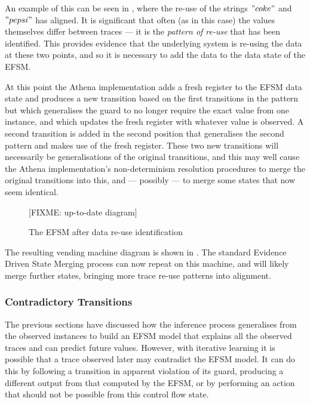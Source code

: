 An example of this can be seen in , where the re-use of the strings $"coke"$ and $"pepsi"$ has aligned. It is significant that often (as in this case) the values themselves differ between traces --- it is the \emph{pattern of re-use} that has been identified. This provides evidence that the underlying system is re-using the data at these two points, and so it is necessary to add the data to the data state of the EFSM. 

At this point the Athena implementation adds a fresh register to the EFSM data state and produces a new transition based on the first transitions in the pattern but which generalises the guard to no longer require the exact value from one instance, and which updates the fresh register with whatever value is observed. A second transition is added in the second position that generalises the second pattern and makes use of the fresh register. These two new transitions will necessarily be generalisations of the original transitions, and this may well cause the Athena implementation's non-determinism resolution procedures to merge the original transitions into this, and --- possibly --- to merge some states that now seem identical.

\begin{figure}[h]
\begin{center}
[FIXME: up-to-date diagram]
\caption{The EFSM after data re-use identification}
\label{fig:EFSM}
\end{center}
\end{figure}

The resulting vending machine diagram is shown in . The standard Evidence Driven State Merging process can now repeat on this machine, and will likely merge further states, bringing more trace re-use patterns into alignment.

\subsubsection{Contradictory Transitions}
\label{Splitting}

The previous sections have discussed how the inference process generalises from the observed instances to build an EFSM model that explains all the observed traces and can predict future values. However, with iterative learning it is possible that a trace observed later may contradict the EFSM model. It can do this by following a transition in apparent violation of its guard, producing a different output from that computed by the EFSM, or by performing an action that should not be possible from this control flow state.


